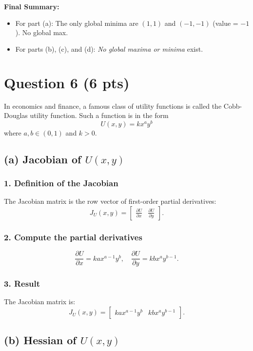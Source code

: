 \documentclass[12pt]{article}
\begin{document}
\vfill
\newpage
\textbf{Final Summary:}
\begin{itemize}
    \item For part (a): The only global minima are $(1,1)$ and $(-1,-1)$ (value = $-1$). No global max.
    \item For parts (b), (c), and (d): \emph{No global maxima or minima} exist.
\end{itemize}

\newpage

\section*{Question 6 (6 pts)}

In economics and finance, a famous class of utility functions is called the Cobb-Douglas utility function. Such a function is in the form 
\[
U(x, y) = kx^a y^b
\]
where \(a, b \in (0, 1)\) and \(k > 0\).

\subsection*{(a) Jacobian of \(U(x, y)\)}

\subsubsection*{1. Definition of the Jacobian}
The Jacobian matrix is the row vector of first-order partial derivatives:
\[
J_U(x, y) = \begin{bmatrix}
\frac{\partial U}{\partial x} & \frac{\partial U}{\partial y}
\end{bmatrix}.
\]

\subsubsection*{2. Compute the partial derivatives}
\[
\frac{\partial U}{\partial x} = k a x^{a-1} y^b, \quad \frac{\partial U}{\partial y} = k b x^a y^{b-1}.
\]

\subsubsection*{3. Result}
The Jacobian matrix is:
\[
J_U(x, y) = \begin{bmatrix}
k a x^{a-1} y^b & k b x^a y^{b-1}
\end{bmatrix}.
\]
\newpage
\subsection*{(b) Hessian of \(U(x, y)\)}
\end{document}
